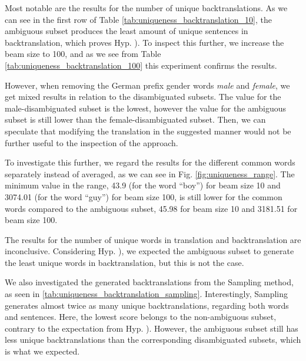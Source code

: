 Most notable are the results for the number of unique backtranslations. As we can see in the first row of Table \ref{tab:uniqueness_backtranslation_10}, the ambiguous subset produces the least amount of unique sentences in backtranslation, which proves Hyp. ). To inspect this further, we increase the beam size to 100, and as we see from Table \ref{tab:uniqueness_backtranslation_100} this experiment confirms the results.

However, when removing the German prefix gender words \textit{male} and \textit{female}, we get mixed results in relation to the disambiguated subsets. The value for the male-disambiguated subset is the lowest, however the value for the ambiguous subset is still lower than the female-disambiguated subset. Then, we can speculate that modifying the translation in the suggested manner would not be further useful to the inspection of the approach.

To investigate this further, we regard the results for the different common words separately instead of averaged, as we can see in Fig. \ref{fig:uniqueness_range}. The minimum value in the range, 43.9 (for the word “boy”) for beam size 10 and 3074.01 (for the word “guy”) for beam size 100, is still lower for the common words compared to the ambiguous subset, 45.98 for beam size 10 and 3181.51 for beam size 100.

The results for the number of unique words in translation and backtranslation are inconclusive. Considering Hyp. ), we expected the ambiguous subset to generate the least unique words in backtranslation, but this is not the case.

We also investigated the generated backtranslations from the Sampling method, as seen in \ref{tab:uniqueness_backtranslation_sampling}. Interestingly, Sampling generates almost twice as many unique backtranslations, regarding both words and sentences. Here, the lowest score belongs to the non-ambiguous subset, contrary to the expectation from Hyp. ). However, the ambiguous subset still has less unique backtranslations than the corresponding disambiguated subsets, which is what we expected.

